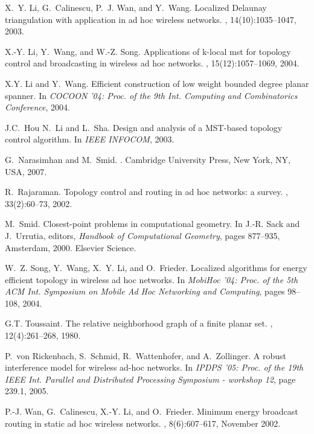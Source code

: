 \documentclass{llncs}
\begin{document}
\begin{thebibliography}{10}
X.~Y. Li, G.~Calinescu, P.~J. Wan, and Y.~Wang.
\newblock Localized {D}elaunay triangulation with application in ad hoc
  wireless networks.
,
  14(10):1035--1047, 2003.

X.-Y. Li, Y.~Wang, and W.-Z. Song.
\newblock Applications of k-local mst for topology control and broadcasting in
  wireless ad hoc networks.
,
  15(12):1057--1069, 2004.

X.Y. Li and Y.~Wang.
\newblock Efficient construction of low weight bounded degree planar spanner.
\newblock In {\em {COCOON} '04: Proc. of the 9th Int. Computing and
  Combinatorics Conference}, 2004.

J.C.~Hou N.~Li and L.~Sha.
\newblock Design and analysis of a {MST}-based topology control algorithm.
\newblock In {\em IEEE INFOCOM}, 2003.

G.~Narasimhan and M.~Smid.
.
\newblock Cambridge University Press, New York, NY, USA, 2007.

R.~Rajaraman.
\newblock Topology control and routing in ad hoc networks: a survey.
, 33(2):60--73, 2002.

M.~Smid.
\newblock Closest-point problems in computational geometry.
\newblock In J.-R. Sack and J.~Urrutia, editors, {\em Handbook of Computational
  Geometry}, pages 877--935, Amsterdam, 2000. Elsevier Science.

W.~Z. Song, Y.~Wang, X.~Y. Li, and O.~Frieder.
\newblock Localized algorithms for energy efficient topology in wireless ad hoc
  networks.
\newblock In {\em Mobi{H}oc '04: Proc. of the 5th ACM Int. Symposium on Mobile
  Ad Hoc Networking and Computing}, pages 98--108, 2004.

G.T. Toussaint.
\newblock The relative neighborhood graph of a finite planar set.
, 12(4):261--268, 1980.

P.~von Rickenbach, S.~Schmid, R.~Wattenhofer, and A.~Zollinger.
\newblock A robust interference model for wireless ad-hoc networks.
\newblock In {\em IPDPS '05: Proc. of the 19th IEEE Int. Parallel and
  Distributed Processing Symposium - workshop 12}, page 239.1, 2005.

P.-J. Wan, G.~Calinescu, X.-Y. Li, and O.~Frieder.
\newblock Minimum energy broadcast routing in static ad hoc wireless networks.
, 8(6):607--617, November 2002.


\end{thebibliography}
\end{document}
